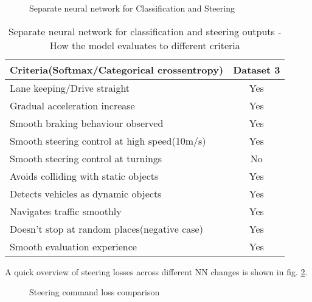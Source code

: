 \begin{figure}[!ht]
	\centering
    \def\svgwidth{0.7\textwidth}
    \caption{Separate neural network for Classification and Steering}
    \label{fig:ds3categoricalcrossentropy2nn}
\end{figure}
\begin{table}[!ht]
    \centering
\begin{tabular}{lc}
    \toprule
    Criteria(Softmax/Categorical crossentropy)  & Dataset 3 \\\midrule
    Lane keeping/Drive straight  & Yes  \\
    Gradual acceleration increase  & Yes\\
    Smooth braking behaviour observed & Yes \\
    Smooth steering control at high speed(10m/s) & Yes \\
    Smooth steering control at turnings & No\\
    Avoids colliding with static objects & Yes \\
    Detects vehicles as dynamic objects & Yes \\
    Navigates traffic smoothly & Yes\\
    Doesn't stop at random places(negative case) & Yes \\
    Smooth evaluation experience & Yes \\\bottomrule
\end{tabular}
\caption{Separate neural network for classification and steering outputs - How the model evaluates to different criteria}
\label{table:cce2NN}
\end{table}

A quick overview of steering losses across different NN changes is shown in fig. \ref{fig:ds3categoricalcrossentropysteeringcompare}.
 \begin{figure}[!ht]
	\centering
    \def\svgwidth{\textwidth}
    \caption{Steering command loss comparison}
    \label{fig:ds3categoricalcrossentropysteeringcompare}
\end{figure}
\newpage \vfill
